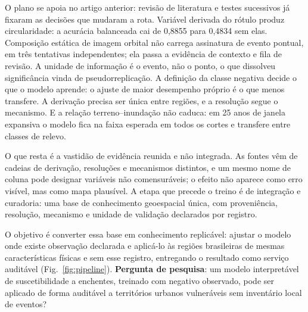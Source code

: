 \documentclass[conference]{IEEEtran}
\begin{document}
O plano se apoia no artigo anterior: revisão de literatura e testes
sucessivos já fixaram as decisões que mudaram a rota. Variável derivada
do rótulo produz circularidade: a acurácia balanceada cai de 0,8855 para 0,4834
sem elas. Composição estática de imagem orbital não carrega assinatura de evento
pontual, em três tentativas independentes; ela passa a evidência de contexto e
fila de revisão. A unidade de informação é o evento, não o ponto, o
que dissolveu significância vinda de pseudorreplicação. A definição da
classe negativa decide o que o modelo aprende: o ajuste de maior desempenho
próprio é o que menos transfere. A derivação precisa ser única entre regiões, e a
resolução segue o mecanismo. E a relação terreno--inundação não caduca: em 25
anos de janela expansiva o modelo fica na faixa esperada em todos os cortes e
transfere entre classes de relevo.

O que resta é a vastidão de evidência reunida e não integrada. As fontes
vêm de cadeias de derivação, resoluções e mecanismos distintos,
e um mesmo nome de coluna pode designar variáveis não comensuráveis; o efeito não aparece como erro visível, mas como mapa plausível. A etapa
que precede o treino é de integração e curadoria: uma base de conhecimento
geoespacial única, com proveniência, resolução, mecanismo e unidade
de validação declarados por registro.

O objetivo é converter essa base em conhecimento replicável: ajustar o modelo
onde existe observação declarada e aplicá-lo às regiões brasileiras de mesmas
características físicas e sem esse registro, entregando o resultado como serviço
auditável (Fig.~\ref{fig:pipeline}).
\textbf{Pergunta de pesquisa}: um modelo interpretável de suscetibilidade a
enchentes, treinado com negativo observado, pode ser aplicado de forma auditável
a territórios urbanos vulneráveis sem inventário local de eventos?
\end{document}
